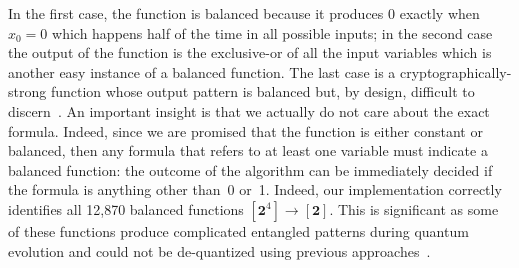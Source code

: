 \documentclass[aps,prl,twocolumn,superscriptaddress,floatfix,notitlepage]{revtex4-2}
\newcommand{\finset}[1]{[\mathbf{#1}]}
\begin{document}
In the first case, the function is balanced because it produces $0$
exactly when $x_0=0$ which happens half of the time in all possible
inputs; in the second case the output of the function is the
exclusive-or of all the input variables which is another easy instance
of a balanced function. The last case is a cryptographically-strong
function whose output pattern is balanced but, by design,
difficult to discern~\cite{quteprints21763}. An important insight is that we actually do not care about the exact
formula. Indeed, since we are promised that the function is either
constant or balanced, then any formula that refers to at least one
variable must indicate a balanced function: the
outcome of the algorithm can be immediately decided if the formula is
anything other than~0 or~1. Indeed, our implementation correctly
identifies all 12,870 balanced functions $\finset{2^\mathrm{4}} \rightarrow
\finset{2}$. This is significant as some of these functions produce
complicated entangled patterns during quantum evolution and could not
be de-quantized using previous approaches~\cite{djdeq}.
\end{document}
